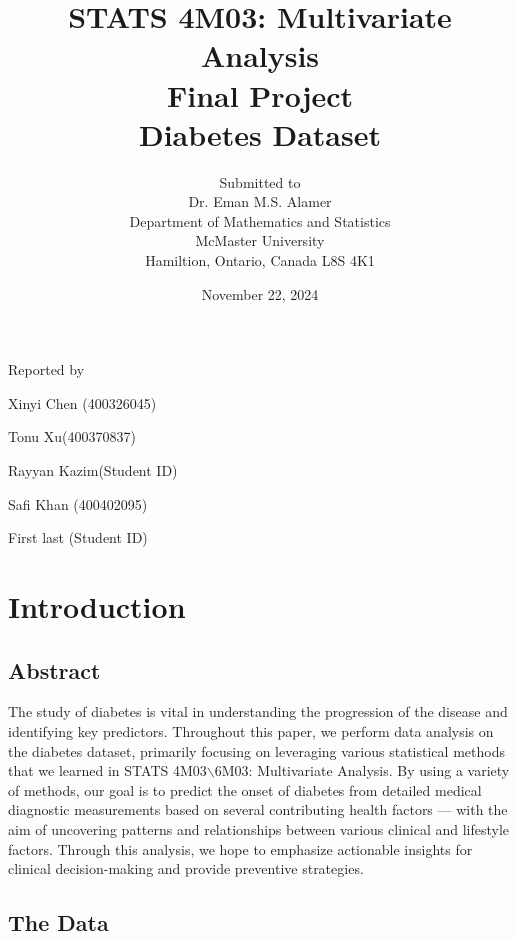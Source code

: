 \documentclass[12pt]{article}
\begin{document}
\title{STATS 4M03: Multivariate Analysis\\ Final Project \\ Diabetes Dataset }

\author{Submitted to\\ Dr. Eman M.S. Alamer 
\\Department of Mathematics and Statistics
\\McMaster University\\Hamiltion, Ontario, Canada L8S 4K1}
\date {November 22, 2024}


\maketitle

 \centerline{Reported by}
 \centerline{Xinyi Chen (400326045)}
  \centerline{Tonu Xu(400370837)}
   \centerline{Rayyan Kazim(Student ID)}
    \centerline{Safi Khan (400402095)}
     \centerline{First last (Student ID)}


\newpage
\section{Introduction}
\subsection{Abstract}

\begin{indent} 

The study of diabetes is vital in understanding the progression of the disease and identifying key predictors. Throughout this paper, we perform data analysis on the diabetes dataset, primarily focusing on leveraging various statistical methods that we learned in STATS 4M03$\backslash$6M03: Multivariate Analysis. By using a variety of methods, our goal is to predict the onset of diabetes from detailed medical diagnostic measurements based on several contributing health factors --- with the aim of uncovering patterns and relationships between various clinical and lifestyle factors. Through this analysis, we hope to emphasize actionable insights for clinical decision-making and provide preventive strategies. 

\end{indent}

\subsection{The Data}
\end{document}
